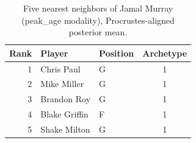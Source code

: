 \begin{table}[htbp]
  \centering\small
  \begin{tabular}{rllc}
    \toprule
    Rank & Player & Position & Archetype \\
    \midrule
    1 & Chris Paul & G & 1 \\
    2 & Mike Miller & G & 1 \\
    3 & Brandon Roy & G & 1 \\
    4 & Blake Griffin & F & 1 \\
    5 & Shake Milton & G & 1 \\
    \bottomrule
  \end{tabular}
  \caption{Five nearest neighbors of Jamal Murray (peak_age modality), Procrustes-aligned posterior mean.}
  \label{tab:Jamal_Murray_neighbors_peak_age}
\end{table}

